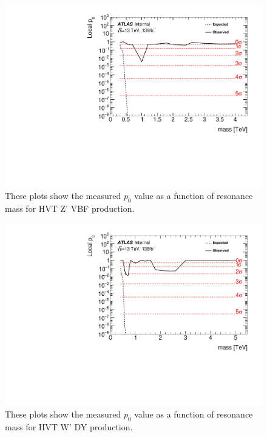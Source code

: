 \begin{figure}[h!]
  \centering
  \includegraphics[width=\hsize]{figures/results/pvalues/hvtwwvbf_pvalue.pdf}
 \caption{These plots show the measured $p_{0}$ value as a function of resonance mass for HVT Z' VBF production.} 
  \label{fig:discov_hvtwwvbf}
\end{figure} 
\FloatBarrier


\begin{figure}[h!]
  \centering
  \includegraphics[width=\hsize]{figures/results/pvalues/hvtwz_pvalue.pdf}
 \caption{These plots show the measured $p_{0}$ value as a function of resonance mass for HVT W' DY production.} 
  \label{fig:discov_hvtwz}
\end{figure} 
\FloatBarrier

